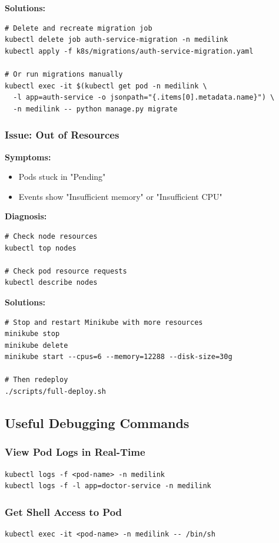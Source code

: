 \documentclass[12pt,a4paper]{article}
\begin{document}
\textbf{Solutions:}
\begin{lstlisting}[style=bash]
# Delete and recreate migration job
kubectl delete job auth-service-migration -n medilink
kubectl apply -f k8s/migrations/auth-service-migration.yaml

# Or run migrations manually
kubectl exec -it $(kubectl get pod -n medilink \
  -l app=auth-service -o jsonpath="{.items[0].metadata.name}") \
  -n medilink -- python manage.py migrate
\end{lstlisting}

\subsubsection{Issue: Out of Resources}

\textbf{Symptoms:}
\begin{itemize}
    \item Pods stuck in "Pending"
    \item Events show "Insufficient memory" or "Insufficient CPU"
\end{itemize}

\textbf{Diagnosis:}
\begin{lstlisting}[style=bash]
# Check node resources
kubectl top nodes

# Check pod resource requests
kubectl describe nodes
\end{lstlisting}

\textbf{Solutions:}
\begin{lstlisting}[style=bash]
# Stop and restart Minikube with more resources
minikube stop
minikube delete
minikube start --cpus=6 --memory=12288 --disk-size=30g

# Then redeploy
./scripts/full-deploy.sh
\end{lstlisting}

\subsection{Useful Debugging Commands}

\subsubsection{View Pod Logs in Real-Time}
\begin{lstlisting}[style=bash]
kubectl logs -f <pod-name> -n medilink
kubectl logs -f -l app=doctor-service -n medilink
\end{lstlisting}

\subsubsection{Get Shell Access to Pod}
\begin{lstlisting}[style=bash]
kubectl exec -it <pod-name> -n medilink -- /bin/sh
\end{lstlisting}
\end{document}
